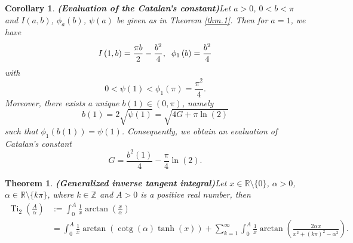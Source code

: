 \documentclass[preprint,12pt,nopreprintline]{elsarticle}
\newtheorem{theorem}{Theorem}
\begin{document}
\vspace{0.2cm}
\newtheorem{corollary}{Corollary}
\begin{corollary}{\textbf{(Evaluation of the Catalan’s constant)}}\label{cor.1}
\textit{Let $a>0$, $0<b<\pi$ and $I\left(a,b\right)$, $\phi_a\left(b\right)$, $\psi\left(a\right)$ be given as in Theorem \ref{thm.1}. Then for $a=1$, we have}
\begin{equation}
\nonumber
I\left(1,b\right)=\frac{\pi b}{2}-\frac{b^2}{4},\hspace{0.2cm}\phi_1\left(b\right)=\frac{b^2}{4}
\end{equation}
\textit{with}
\begin{equation}
\nonumber
0<\psi\left(1\right)<\phi_1\left(\pi\right)=\frac{\pi^2}{4}.
\end{equation}
\textit{Moreover, there exists a unique $b\left(1\right)\in\left(0,\pi\right)$, namely}
\begin{equation}
\nonumber
b\left(1\right)=2\sqrt{\psi\left(1\right)}=\sqrt{4G+\pi\operatorname{ln}\left(2\right)}
\end{equation}
\textit{such that $\phi_1\left(b\left(1\right)\right)=\psi\left(1\right)$. Consequently, we obtain an evaluation of Catalan’s constant}
\begin{equation}
G=\frac{b^2\left(1\right)}{4}-\frac{\pi}{4}\operatorname{ln}\left(2\right).
\end{equation}
\end{corollary}

\vspace{0.2cm}
\begin{theorem}{\textbf{(Generalized inverse tangent integral)}}\label{thm.2}
\textit{Let $x\in\mathbb{R}\setminus\{0\}$, $\alpha>0$, $\alpha\in\mathbb{R}\setminus\{k\pi\}$, where $k\in\mathbb{Z}$ and $A>0$ is a positive real number, then}
\begin{equation}\label{eq:2}
\begin{aligned}
\operatorname{Ti}_2\left(\frac{A}{\alpha}\right)&:=\int_0^A\frac{1}{x}\operatorname{arctan}\left(\frac{x}{\alpha}\right)
\\&=\int_0^A\frac{1}{x}\operatorname{arctan}\left(\operatorname{cotg}\left(\alpha\right)\operatorname{tanh}\left(x\right)\right)+\sum_{k=1}^{\infty}\int_0^A\frac{1}{x}\operatorname{arctan}\left(\frac{2\alpha x}{x^2+\left(k\pi\right)^2-\alpha^2}\right).
\end{aligned}
\end{equation}
\end{theorem}
\end{document}
